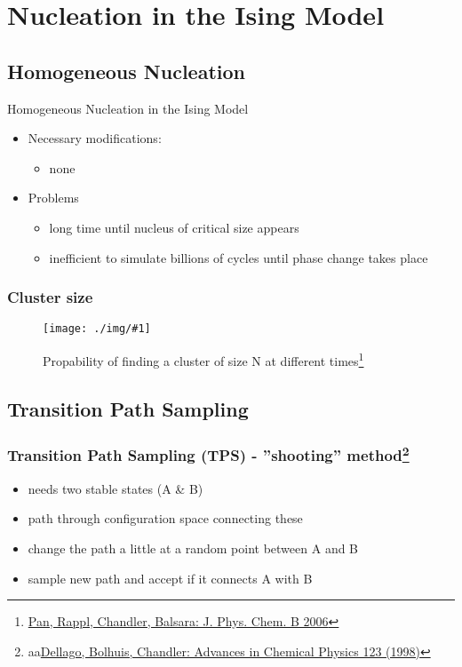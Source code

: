 \documentclass{beamer}
\newcommand{\fig}[2]{\begin{figure}[h]\begin{center}\texttt{[image: ./img/\#1]}\end{center}\caption{{#2}}\end{figure}}
\begin{document}
\section{Nucleation in the Ising Model}
\subsection{Homogeneous Nucleation}
\begin{frame}{Homogeneous Nucleation in the Ising Model}
\begin{itemize}
\item Necessary modifications:\begin{itemize}
\item none\\
\end{itemize}\end{itemize}\begin{itemize}
\item Problems
\begin{itemize}
\item long time until nucleus of critical size appears 
\item inefficient to simulate billions of cycles until phase change takes place
\end{itemize}
\end{itemize}
\end{frame}


\begin{frame}\frametitle{Cluster size}
\fig{nsize.png}{Propability of finding a cluster of size N at different times\footnote{\href{http://www.ncbi.nlm.nih.gov/pubmed/16494425}{Pan, Rappl, Chandler, Balsara: J. Phys. Chem. B 2006}}}
\end{frame}


\subsection{Transition Path Sampling}
\begin{frame}\frametitle{Transition Path Sampling (TPS) - ''shooting'' method\footnote{aa\href{http://dx.doi.org/10.1063\%2F1.476378}{Dellago, Bolhuis, Chandler: Advances in Chemical Physics 123 (1998)}}}
\begin{itemize}
\item needs two stable states (A \& B)
\item path through configuration space connecting these
\item change the path a little at a random point between A and B
\item sample new path and accept if it connects A with B
\end{itemize}
\end{frame}
\end{document}
